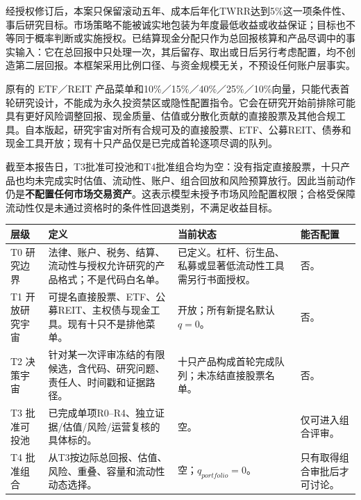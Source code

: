 \begin{houseviewbox}
经授权修订后，本案只保留滚动五年、成本后年化TWRR达到5\%这一项条件性、事后研究目标。市场策略不能被诚实地包装为年度最低收益或收益保证；目标也不等同于概率判断或实施授权。已结算现金分配只作为总回报核算和产品尽调中的事实输入：它在总回报中只处理一次，其后留存、取出或日后另行考虑配置，均不创造第二层回报。本框架采用比例口径、与资金规模无关，不预设任何账户层事实。

原有的 ETF／REIT 产品菜单和10\%／15\%／40\%／25\%／10\%向量，只能代表首轮研究设计，不能成为永久投资禁区或隐性配置指令。它会在研究开始前排除可能具有更好风险调整回报、现金质量、估值或分散化贡献的直接股票及其他合规工具。自本版起，研究宇宙对所有合规可及的直接股票、ETF、公募REIT、债券和现金工具开放；现有十只产品仅是已完成首轮逐项尽调的队列。

截至本报告日，T3批准可投池和T4批准组合均为空：没有指定直接股票，十只产品也均未完成实时估值、流动性、账户、组合回放和风险预算放行。因此当前动作仍是\textbf{不配置任何市场交易资产}。这表示模型未授予市场风险配置权限；合格受保障流动性仅是未通过资格时的条件性回退类别，不满足收益目标。
\end{houseviewbox}

\begin{exhibitbox}
\small
\begin{tabularx}{\exhibitboxwidth}{L{2.2cm}L{3.0cm}P P}
\toprule
\textbf{层级} & \textbf{定义} & \textbf{当前状态} & \textbf{能否配置} \\
\midrule
T0 研究边界 & 法律、账户、税务、结算、流动性与授权允许研究的产品格式；不是代码白名单。 & 已定义。杠杆、衍生品、私募或显著低流动性工具需另行书面授权。 & 否。\\
T1 开放研究宇宙 & 可提名直接股票、ETF、公募REIT、主权债与现金工具。现有十只不是排他菜单。 & 开放；所有新提名默认$q=0$。 & 否。\\
T2 决策宇宙 & 针对某一次评审冻结的有限候选，含代码、研究问题、责任人、时间戳和证据路径。 & 十只产品构成首轮完成队列；未冻结直接股票名单。 & 否。\\
T3 批准可投池 & 已完成单项R0--R4、独立证据/估值/风险/运营复核的具体标的。 & 空。 & 仅可进入组合评审。\\
T4 批准组合 & 从T3按边际总回报、估值、风险、重叠、容量和流动性动态选择。 & 空；$q_{portfolio}=0$。 & 只有取得组合审批后才可讨论。\\
\bottomrule
\end{tabularx}
\end{exhibitbox}

